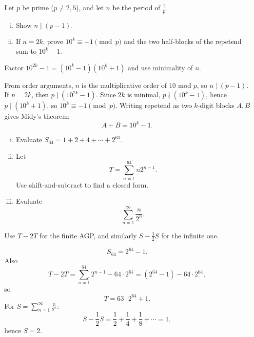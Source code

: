 \begin{problem}
Let $p$ be prime ($p\neq2,5$), and let $n$ be the period of $\frac1p$.
\begin{enumerate}[(i)]
\item Show $n\mid (p-1)$.
\item If $n=2k$, prove $10^k\equiv-1\pmod p$ and the two half-blocks of the repetend sum to $10^k-1$.
\end{enumerate}
\end{problem}
\begin{hint}
Factor $10^{2k}-1=(10^k-1)(10^k+1)$ and use minimality of $n$.
\end{hint}
\begin{solution}
From order arguments, $n$ is the multiplicative order of $10$ mod $p$, so $n\mid(p-1)$.
If $n=2k$, then $p\mid(10^{2k}-1)$. Since $2k$ is minimal, $p\nmid(10^k-1)$, hence $p\mid(10^k+1)$, so $10^k\equiv-1\pmod p$.
Writing repetend as two $k$-digit blocks $A,B$ gives Midy's theorem:
\[
A+B=10^k-1.
\]
\end{solution}

\begin{problem}
\begin{enumerate}[(i)]
\item Evaluate $S_{64}=1+2+4+\cdots+2^{63}$.
\item Let
\[
T=\sum_{n=1}^{64} n2^{n-1}.
\]
Use shift-and-subtract to find a closed form.
\item Evaluate
\[
\sum_{n=1}^{\infty}\frac{n}{2^n}.
\]
\end{enumerate}
\end{problem}
\begin{hint}
Use $T-2T$ for the finite AGP, and similarly $S-\frac12S$ for the infinite one.
\end{hint}
\begin{solution}
\[
S_{64}=2^{64}-1.
\]
Also
\[
T-2T=\sum_{n=1}^{64}2^{n-1}-64\cdot2^{64}
=(2^{64}-1)-64\cdot2^{64},
\]
so
\[
T=63\cdot2^{64}+1.
\]
For $S=\sum_{n=1}^\infty \frac{n}{2^n}$:
\[
S-\frac12S=\frac12+\frac14+\frac18+\cdots=1,
\]
hence $S=2$.
\end{solution}


